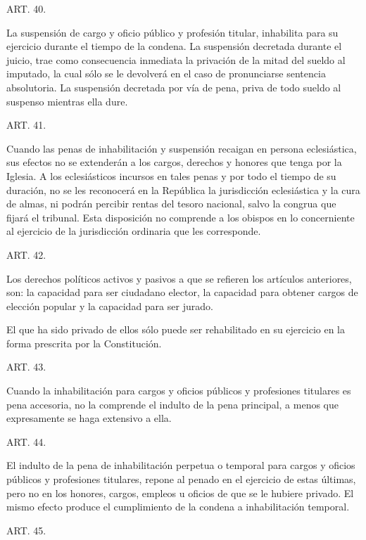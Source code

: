     ART. 40.

    La suspensión de cargo y oficio público y profesión titular, inhabilita para su ejercicio durante el tiempo de la condena.
    La suspensión decretada durante el juicio, trae como consecuencia inmediata la privación de la mitad del sueldo al imputado, la cual sólo se le devolverá en el caso de pronunciarse sentencia absolutoria.
    La suspensión decretada por vía de pena, priva de todo sueldo al suspenso mientras ella dure.

    ART. 41.

    Cuando las penas de inhabilitación y suspensión recaigan en persona eclesiástica, sus efectos no se extenderán a los cargos, derechos y honores que tenga por la Iglesia. A los eclesiásticos incursos en tales penas y por todo el tiempo de su duración, no se les reconocerá en la República la jurisdicción eclesiástica y la cura de almas, ni podrán percibir rentas del tesoro nacional, salvo la congrua que fijará el tribunal.
    Esta disposición no comprende a los obispos en lo concerniente al ejercicio de la jurisdicción ordinaria que les corresponde.


    ART. 42.

    Los derechos políticos activos y pasivos a que se refieren los artículos anteriores, son: la capacidad para ser ciudadano elector, la capacidad para obtener cargos de elección popular y la capacidad para ser jurado.   

    El que ha sido privado de ellos sólo puede ser rehabilitado en su ejercicio en la forma prescrita por la Constitución.




    ART. 43.

    Cuando la inhabilitación para cargos y oficios públicos y profesiones titulares es pena accesoria, no la comprende el indulto de la pena principal, a menos que expresamente se haga extensivo a ella.


    ART. 44.

    El indulto de la pena de inhabilitación perpetua o temporal para cargos y oficios públicos y profesiones titulares, repone al penado en el ejercicio de estas últimas, pero no en los honores, cargos, empleos u oficios de que se le hubiere privado. El mismo efecto produce el cumplimiento de la condena a inhabilitación temporal.



    ART. 45.

